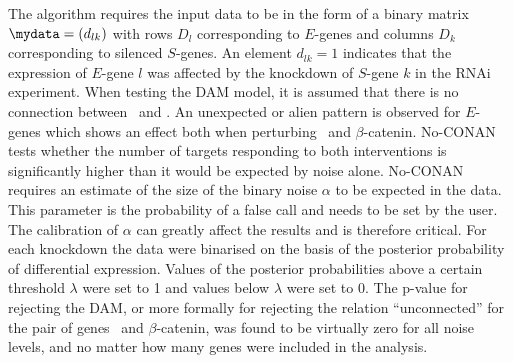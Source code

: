  The algorithm requires the input data to be in the form of a binary matrix $\mydata=(d_{lk})$ with rows $D_l$ corresponding to $E$-genes and 
columns $D_k$ corresponding to silenced $S$-genes. 
An element $d_{lk}=1$ indicates that the expression of $E$-gene $l$ was affected by the knockdown of $S$-gene $k$ in the RNAi experiment. 
When testing the DAM model, 
it is assumed that there is no connection between \eviG~and \betaCatG. An unexpected or alien pattern is observed for $E$-genes which shows an effect both when perturbing \eviG~and $\beta$-catenin. No-CONAN tests whether the number of targets responding to both interventions is significantly higher than it would be expected by noise alone. No-CONAN requires an estimate of the size of the binary noise $\alpha$ to be expected in the data. This parameter is the probability of a false call and needs to be set by the user.  The calibration of $\alpha$ can greatly affect the results and is therefore critical.
For each knockdown the data were binarised on the basis of the posterior probability of differential expression. Values of the posterior probabilities above a certain threshold $\lambda$ were set to 1 and values below $\lambda$ were set to 0.  The p-value for rejecting the DAM, or more formally for rejecting the relation ``unconnected'' for the pair of genes \eviG~and $\beta$-catenin, was found to be virtually zero for all noise levels, and no matter how many genes were included in the analysis.

